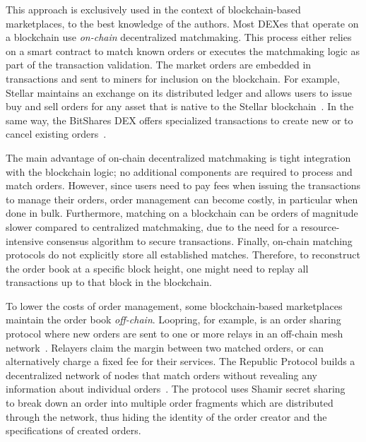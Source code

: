 This approach is exclusively used in the context of blockchain-based marketplaces, to the best knowledge of the authors.
Most DEXes that operate on a blockchain use \emph{on-chain} decentralized matchmaking.
This process either relies on a smart contract to match known orders or executes the matchmaking logic as part of the transaction validation.
The market orders are embedded in transactions and sent to miners for inclusion on the blockchain.
For example, Stellar maintains an exchange on its distributed ledger and allows users to issue buy and sell orders for any asset that is native to the Stellar blockchain~\cite{lokhava2019fast}.
In the same way, the BitShares DEX offers specialized transactions to create new or to cancel existing orders~\cite{schuh2015bitshares}.

The main advantage of on-chain decentralized matchmaking is tight integration with the blockchain logic; no additional components are required to process and match orders.
However, since users need to pay fees when issuing the transactions to manage their orders, order management can become costly, in particular when done in bulk.
Furthermore, matching on a blockchain can be orders of magnitude slower compared to centralized matchmaking, due to the need for a resource-intensive consensus algorithm to secure transactions.
Finally, on-chain matching protocols do not explicitly store all established matches.
Therefore, to reconstruct the order book at a specific block height, one might need to replay all transactions up to that block in the blockchain.

To lower the costs of order management, some blockchain-based marketplaces maintain the order book \emph{off-chain}.
Loopring, for example, is an order sharing protocol where new orders are sent to one or more relays in an off-chain mesh network~\cite{loopring}.
Relayers claim the margin between two matched orders, or can alternatively charge a fixed fee for their services.
The Republic Protocol builds a decentralized network of nodes that match orders without revealing any information about individual orders~\cite{zhang2017republic}.
The protocol uses Shamir secret sharing~\cite{shamir1979share} to break down an order into multiple order fragments which are distributed through the network, thus hiding the identity of the order creator and the specifications of created orders.


